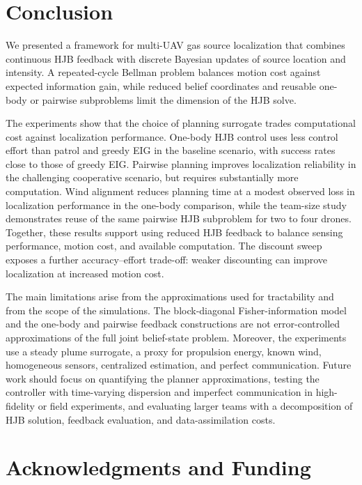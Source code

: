 \documentclass{article}
\begin{document}
\FloatBarrier

\section{Conclusion}
\label{sec:conclusion}

We presented a framework for multi-UAV gas source localization that combines continuous HJB feedback with discrete Bayesian updates of source location and intensity.
A repeated-cycle Bellman problem balances motion cost against expected information gain, while reduced belief coordinates and reusable one-body or pairwise subproblems limit the dimension of the HJB solve.

The experiments show that the choice of planning surrogate trades computational cost against localization performance.
One-body HJB control uses less control effort than patrol and greedy EIG in the baseline scenario, with success rates close to those of greedy EIG.
Pairwise planning improves localization reliability in the challenging cooperative scenario, but requires substantially more computation.
Wind alignment reduces planning time at a modest observed loss in localization performance in the one-body comparison, while the team-size study demonstrates reuse of the same pairwise HJB subproblem for two to four drones.
Together, these results support using reduced HJB feedback to balance sensing performance, motion cost, and available computation.
The discount sweep exposes a further accuracy--effort trade-off: weaker discounting can improve localization at increased motion cost.

The main limitations arise from the approximations used for tractability and from the scope of the simulations.
The block-diagonal Fisher-information model and the one-body and pairwise feedback constructions are not error-controlled approximations of the full joint belief-state problem.
Moreover, the experiments use a steady plume surrogate, a proxy for propulsion energy, known wind, homogeneous sensors, centralized estimation, and perfect communication.
Future work should focus on quantifying the planner approximations, testing the controller with time-varying dispersion and imperfect communication in high-fidelity or field experiments, and evaluating larger teams with a decomposition of HJB solution, feedback evaluation, and data-assimilation costs.

\section*{Acknowledgments and Funding}
\end{document}
